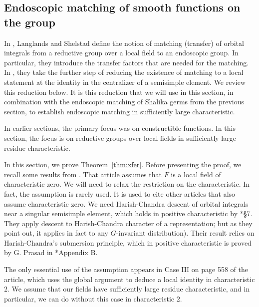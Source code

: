 \documentclass[12pt]{amsart}
\theoremstyle{plain}
\theoremstyle{definition}
\begin{document}
\subsection{Endoscopic matching of smooth functions on the group}

In \cite{LSxf}, Langlands and Shelstad define the notion of matching
(transfer) of orbital integrals from a reductive group over a local
field to an endoscopic group.  In particular, they introduce the
transfer factors that are needed for the matching.  In \cite{LSd},
they take the further step of reducing the existence of matching to
a local statement at the identity in the centralizer of a semisimple
element.  We review this reduction below.  It is this reduction that
we will use in this section, in combination with the endoscopic
matching of Shalika germs from the previous section, to establish
endoscopic matching in sufficiently large characteristic.

In earlier sections, the primary focus was on constructible
functions.  In this section, the focus is on reductive groups over
local fields in sufficiently large residue characteristic.


In this section, we prove Theorem~\ref{thm:xfer}.  Before presenting
the proof, we recall some results from \cite{LSd}.  That article
assumes that $F$ is a local field of characteristic zero.  We will
need to relax the restriction on the characteristic.  In fact, the
assumption is rarely used.  It is used to cite other articles that
also assume characteristic zero.  We need Harish-Chandra descent of
orbital integrals near a singular semisimple element, which holds in
positive characteristic by \cite{adler-korman}*{\S 7}. They
apply descent to Harish-Chandra character of a
representation; but as they point out, it applies in fact to any
$G$-invariant distribution). Their result relies on Harish-Chandra's
submersion principle, which in positive characteristic is proved by
G. Prasad in \cite{adler-debacker:mktheory}*{Appendix B}.



The only essential use of the assumption appears in Case III on page
558 of the article, which uses the global argument to deduce a local
identity in characteristic $2$.  We assume that our fields have
sufficiently large residue characteristic, and in particular, we can
do without this case in characteristic $2$.
\end{document}

